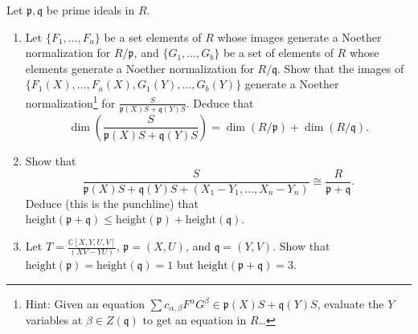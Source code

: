 \documentclass[12pt]{amsart}
\newcommand{\C}{\mathbb{C}}
\newcommand{\p}{\mathfrak{p}}
\newcommand{\q}{\mathfrak{q}}
\newcommand{\hgt}{\mathrm{height}}
\newcommand{\ds}{\displaystyle}
\begin{document}
\begin{enumerate}
 Let $\p,\q$ be prime ideals in $R$.
 \begin{enumerate}
\item Let $\{F_1,\dots,F_a\}$ be a set elements of $R$ whose images generate a Noether normalization for $R/\p$, and $\{G_1,\dots,G_b\}$ be a set of elements of $R$ whose elements generate a Noether normalization for $R/\q$. Show that the images of $\{F_1(X),\dots,F_a(X),G_1(Y),\dots,G_b(Y)\}$ generate a Noether normalization\footnote{Hint: Given an equation $\sum c_{\alpha,\beta} F^\alpha G^\beta \in \p(X) S + \q(Y) S$, evaluate the $Y$ variables at $\beta\in Z(\q)$ to get an equation in $R$\dots} for $\ds\frac{S}{\p(X) S + \q(Y)S}$. Deduce that 
\[\dim\left(\frac{S}{\p(X) S + \q(Y)S}\right) = \dim(R/\p) + \dim(R/\q).\]
\item Show that \[\frac{S}{\p(X) S + \q(Y)S + (X_1-Y_1,\dots,X_n-Y_n)}\cong \frac{R}{\p+\q}.\] Deduce (this is the punchline) that $\hgt(\p+\q) \leq \hgt(\p) + \hgt(\q)$.
\item Let $\ds T=\frac{\C[X,Y,U,V]}{(XV-YU)}$, $\p=(X,U)$, and $\q=(Y,V)$. Show that $\hgt(\p)=\hgt(\q)=1$ but $\hgt(\p+\q)=3$.
\end{enumerate}




\end{enumerate}
\end{document}

